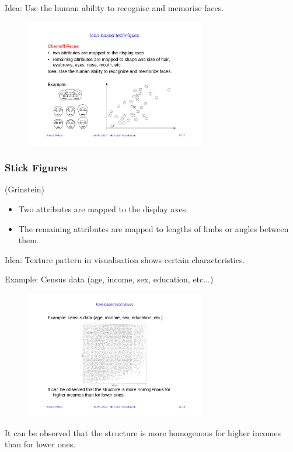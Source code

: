 Idea: Use the human ability to recognise and memorise faces.
\begin{figure}[H]
\centering
\includegraphics[width=0.7\textwidth]{img/12_chernoff_faces}
\end{figure}

\subsubsection{Stick Figures}
(Grinstein)
\begin{itemize}
\item Two attributes are mapped to the display axes.
\item The remaining attributes are mapped to lengths of limbs or angles between them.
\end{itemize}

Idea: Texture pattern in visualisation shows certain characteristics.

Example: Census data (age, income, sex, education, etc...)
\begin{figure}[H]
\centering
\includegraphics[width=0.7\textwidth]{img/12_stick_figures}
\end{figure}
It can be observed that the structure is more homogenous for higher incomes than for lower ones.

